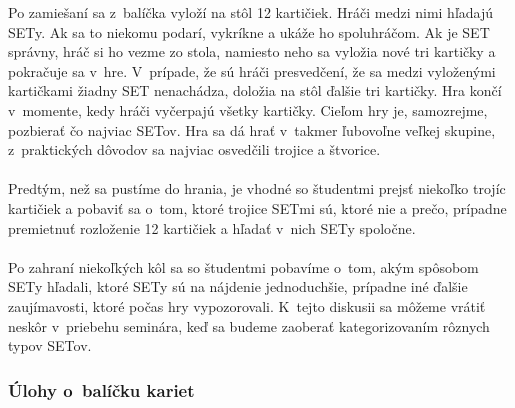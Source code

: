 {Po zamiešaní sa z~balíčka vyloží na stôl 12 kartičiek. Hráči medzi nimi hľadajú SETy. Ak sa to niekomu podarí, vykríkne  a ukáže ho spoluhráčom. Ak je SET správny, hráč si ho vezme zo stola, namiesto neho sa vyložia nové tri kartičky a pokračuje sa v~hre. V~prípade, že sú hráči presvedčení, že sa medzi vyloženými kartičkami žiadny SET nenachádza, doložia na stôl ďalšie tri kartičky. Hra končí v~momente, kedy hráči vyčerpajú všetky kartičky. Cieľom hry je, samozrejme, pozbierať čo najviac SETov. Hra sa dá hrať v~takmer ľubovoľne veľkej skupine, z~praktických dôvodov sa najviac osvedčili trojice a štvorice.\\
\\
\kom Predtým, než sa pustíme do hrania, je vhodné so študentmi prejsť niekoľko trojíc kartičiek a pobaviť sa o~tom, ktoré trojice SETmi sú, ktoré nie a prečo, prípadne premietnuť rozloženie 12 kartičiek a hľadať v~nich SETy spoločne. \\
\\
Po zahraní niekoľkých kôl sa so študentmi pobavíme o~tom, akým spôsobom SETy hľadali, ktoré SETy sú na nájdenie jednoduchšie, prípadne iné ďalšie zaujímavosti, ktoré počas hry vypozorovali. K~tejto diskusii sa môžeme vrátiť neskôr v~priebehu seminára, keď sa budeme zaoberať kategorizovaním rôznych typov SETov.

\subsubsection*{Úlohy o~balíčku kariet}}



